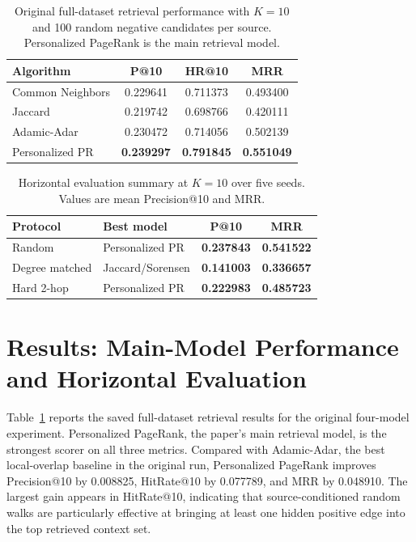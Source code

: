 \documentclass[10pt,twocolumn]{article}
\begin{document}
\begin{table}[t]
\centering
\caption{Original full-dataset retrieval performance with $K=10$ and 100 random negative candidates per source. Personalized PageRank is the main retrieval model.}
\label{tab:main-results}
\scriptsize
\begin{tabular}{@{}lccc@{}}
\toprule
Algorithm & P@10 & HR@10 & MRR \\
\midrule
Common Neighbors & 0.229641 & 0.711373 & 0.493400 \\
Jaccard & 0.219742 & 0.698766 & 0.420111 \\
Adamic-Adar & 0.230472 & 0.714056 & 0.502139 \\
Personalized PR & \textbf{0.239297} & \textbf{0.791845} & \textbf{0.551049} \\
\bottomrule
\end{tabular}
\end{table}

\begin{table}[t]
\centering
\caption{Horizontal evaluation summary at $K=10$ over five seeds. Values are mean Precision@10 and MRR.}
\label{tab:horizontal-summary}
\scriptsize
\begin{tabular}{@{}llcc@{}}
\toprule
Protocol & Best model & P@10 & MRR \\
\midrule
Random & Personalized PR & \textbf{0.237843} & \textbf{0.541522} \\
Degree matched & Jaccard/Sorensen & \textbf{0.141003} & \textbf{0.336657} \\
Hard 2-hop & Personalized PR & \textbf{0.222983} & \textbf{0.485723} \\
\bottomrule
\end{tabular}
\end{table}

\section{Results: Main-Model Performance and Horizontal Evaluation}
Table~\ref{tab:main-results} reports the saved full-dataset retrieval results for the original four-model experiment. Personalized PageRank, the paper's main retrieval model, is the strongest scorer on all three metrics. Compared with Adamic-Adar, the best local-overlap baseline in the original run, Personalized PageRank improves Precision@10 by 0.008825, HitRate@10 by 0.077789, and MRR by 0.048910. The largest gain appears in HitRate@10, indicating that source-conditioned random walks are particularly effective at bringing at least one hidden positive edge into the top retrieved context set.
\end{document}
